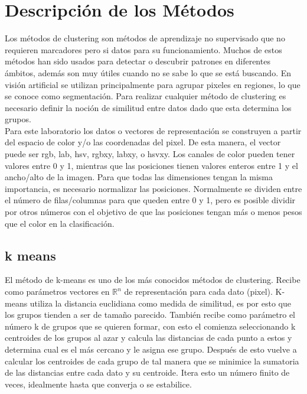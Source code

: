 \documentclass[10pt,twocolumn,letterpaper]{article}
\begin{document}
\section{Descripción de los Métodos}
Los métodos de clustering son métodos de aprendizaje no supervisado  que no requieren marcadores pero si datos para su funcionamiento. Muchos de estos métodos han sido usados para detectar o descubrir patrones en diferentes ámbitos, además son muy útiles cuando no se sabe lo que se está buscando. En visión artificial se utilizan principalmente para agrupar pixeles en regiones, lo que se conoce como segmentación. Para realizar cualquier método de clustering es necesario definir la noción de similitud entre datos dado que esta determina los grupos. \\
Para este laboratorio los datos o vectores de representación se construyen a partir del espacio de color y/o las coordenadas del pixel. De esta manera, el vector puede ser rgb, lab, hsv, rgbxy, labxy, o hsvxy. Los canales de color pueden tener valores entre 0 y 1, mientras que las posiciones tienen valores enteros entre 1 y el ancho/alto de la imagen. Para que todas las dimensiones tengan la misma importancia, es necesario normalizar las posiciones. Normalmente se dividen entre el número de filas/columnas para que queden entre 0 y 1, pero es posible dividir por otros números con el objetivo de que las posiciones tengan más o menos pesos que el color en la clasificación.

\subsection{k means}
El método de k-means es uno de los más conocidos métodos de clustering. Recibe como parámetros vectores en $\mathds{R}^n$ de representación para cada dato (pixel). K-means utiliza la distancia euclidiana como medida de similitud, es por esto que los grupos tienden a ser de tamaño parecido. También recibe como parámetro el número k de grupos que se quieren formar, con esto el comienza seleccionando k centroides de los grupos al azar y calcula las distancias de cada punto a estos y determina cual es el más cercano y le asigna ese grupo. Después de esto vuelve a calcular los centroides de cada grupo de tal manera que se minimice la sumatoria de las distancias entre cada dato y su centroide. Itera esto un número finito de veces, idealmente hasta que converja o se estabilice.
\end{document}
